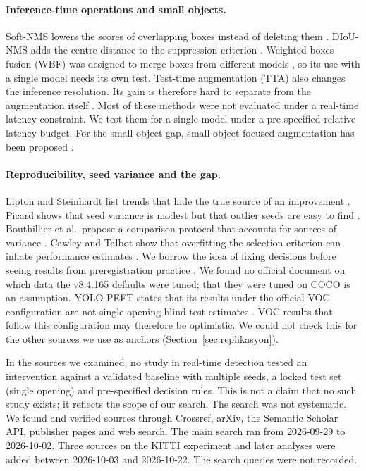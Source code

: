 \documentclass[pdflatex,iicol,sn-mathphys-num]{sn-jnl}
\begin{document}
\paragraph{Inference-time operations and small objects.}
Soft-NMS lowers the scores of overlapping boxes instead of deleting them \cite{bodla_2017_softnms}. DIoU-NMS adds the centre distance to the suppression criterion \cite{zheng_2020_diou}. Weighted boxes fusion (WBF) was designed to merge boxes from different models \cite{solovyev_2021_wbf}, so its use with a single model needs its own test. Test-time augmentation (TTA) also changes the inference resolution. Its gain is therefore hard to separate from the augmentation itself \cite{ultralytics_2026_yolov5tta}. Most of these methods were not evaluated under a real-time latency constraint. We test them for a single model under a pre-specified relative latency budget. For the small-object gap, small-object-focused augmentation has been proposed \cite{kisantal_2019_smallaug}.

\paragraph{Reproducibility, seed variance and the gap.}
Lipton and Steinhardt list trends that hide the true source of an improvement \cite{lipton_2019_troubling}. Picard shows that seed variance is modest but that outlier seeds are easy to find \cite{picard_2021_seed}. Bouthillier et al.\ propose a comparison protocol that accounts for sources of variance \cite{bouthillier_2021_variance}. Cawley and Talbot show that overfitting the selection criterion can inflate performance estimates \cite{cawley_2010_overfitting}. We borrow the idea of fixing decisions before seeing results from preregistration practice \cite{nosek_2018_preregistration}. We found no official document on which data the v8.4.165 defaults were tuned; that they were tuned on COCO is an assumption. YOLO-PEFT states that its results under the official VOC configuration are not single-opening blind test estimates \cite{lin_2026_yolopeft}. VOC results that follow this configuration may therefore be optimistic. We could not check this for the other sources we use as anchors (Section~\ref{sec:replikasyon}).

In the sources we examined, no study in real-time detection tested an intervention against a validated baseline with multiple seeds, a locked test set (single opening) and pre-specified decision rules. This is not a claim that no such study exists; it reflects the scope of our search. The search was not systematic. We found and verified sources through Crossref, arXiv, the Semantic Scholar API, publisher pages and web search. The main search ran from 2026-09-29 to 2026-10-02. Three sources on the KITTI experiment and later analyses were added between 2026-10-03 and 2026-10-22. The search queries were not recorded.
\end{document}
